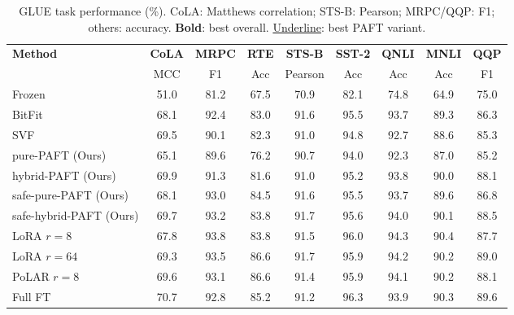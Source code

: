 \begin{table}[t]
\centering
\caption{GLUE task performance (\%). CoLA: Matthews correlation; STS-B: Pearson; MRPC/QQP: F1; others: accuracy. \textbf{Bold}: best overall. \underline{Underline}: best PAFT variant.}
\label{tab:glue_performance}
\setlength{\tabcolsep}{5pt}
\renewcommand{\arraystretch}{1.12}
\begin{tabular}{lcccccccc}
\toprule
\textbf{Method} & \textbf{CoLA} & \textbf{MRPC} & \textbf{RTE} & \textbf{STS-B} & \textbf{SST-2} & \textbf{QNLI} & \textbf{MNLI} & \textbf{QQP} \\
 & \scriptsize MCC & \scriptsize F1 & \scriptsize Acc & \scriptsize Pearson & \scriptsize Acc & \scriptsize Acc & \scriptsize Acc & \scriptsize F1 \\
\midrule
Frozen & 51.0 & 81.2 & 67.5 & 70.9 & 82.1 & 74.8 & 64.9 & 75.0 \\
\midrule
BitFit & 68.1 & 92.4 & 83.0 & 91.6 & 95.5 & 93.7 & 89.3 & 86.3 \\
SVF & 69.5 & 90.1 & 82.3 & 91.0 & 94.8 & 92.7 & 88.6 & 85.3 \\
\midrule
pure-PAFT (Ours) & 65.1 & 89.6 & 76.2 & 90.7 & 94.0 & 92.3 & 87.0 & 85.2 \\
hybrid-PAFT (Ours) & 69.9 & 91.3 & 81.6 & 91.0 & 95.2 & 93.8 & 90.0 & 88.1 \\
safe-pure-PAFT (Ours) & 68.1 & 93.0 & 84.5 & 91.6 & 95.5 & 93.7 & 89.6 & 86.8 \\
safe-hybrid-PAFT (Ours) & 69.7 & 93.2 & 83.8 & 91.7 & 95.6 & 94.0 & 90.1 & 88.5 \\
\midrule
LoRA $r{=}8$ & 67.8 & 93.8 & 83.8 & 91.5 & 96.0 & 94.3 & 90.4 & 87.7 \\
LoRA $r{=}64$ & 69.3 & 93.5 & 86.6 & 91.7 & 95.9 & 94.2 & 90.2 & 89.0 \\
PoLAR $r{=}8$ & 69.6 & 93.1 & 86.6 & 91.4 & 95.9 & 94.1 & 90.2 & 88.1 \\
\midrule
Full FT & 70.7 & 92.8 & 85.2 & 91.2 & 96.3 & 93.9 & 90.3 & 89.6 \\
\bottomrule
\end{tabular}
\end{table}
